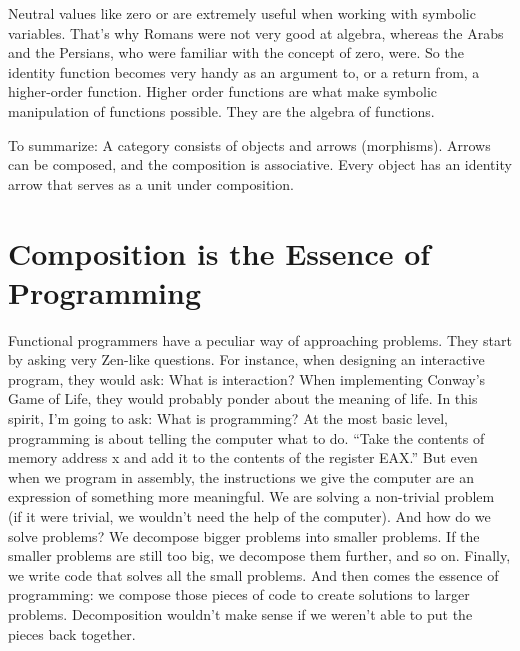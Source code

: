 Neutral values like zero or  are extremely useful when
working with symbolic variables. That's why Romans were not very good at
algebra, whereas the Arabs and the Persians, who were familiar with the
concept of zero, were. So the identity function becomes very handy as an
argument to, or a return from, a higher-order function. Higher order
functions are what make symbolic manipulation of functions possible.
They are the algebra of functions.

To summarize: A category consists of objects and arrows (morphisms).
Arrows can be composed, and the composition is associative. Every object
has an identity arrow that serves as a unit under composition.

\section{Composition is the Essence of
Programming}\label{composition-is-the-essence-of-programming}

Functional programmers have a peculiar way of approaching problems. They
start by asking very Zen-like questions. For instance, when designing an
interactive program, they would ask: What is interaction? When
implementing Conway's Game of Life, they would probably ponder about the
meaning of life. In this spirit, I'm going to ask: What is programming?
At the most basic level, programming is about telling the computer what
to do. ``Take the contents of memory address x and add it to the
contents of the register EAX.'' But even when we program in assembly,
the instructions we give the computer are an expression of something
more meaningful. We are solving a non-trivial problem (if it were
trivial, we wouldn't need the help of the computer). And how do we solve
problems? We decompose bigger problems into smaller problems. If the
smaller problems are still too big, we decompose them further, and so
on. Finally, we write code that solves all the small problems. And then
comes the essence of programming: we compose those pieces of code to
create solutions to larger problems. Decomposition wouldn't make sense
if we weren't able to put the pieces back together.

